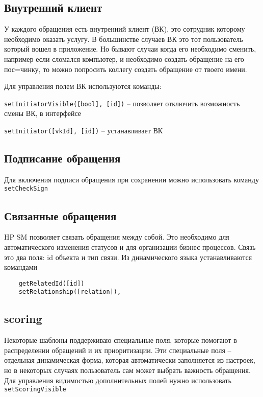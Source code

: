 \documentclass[../index.tex]{subfiles}
\begin{document}
\subsection{Внутренний клиент}

У каждого обращения есть внутренний клиент (ВК), это сотрудник которому необходимо оказать услугу. В большинстве случаев 
ВК это тот пользователь который вошел в приложение. Но бывают случаи когда его необходимо сменить, например если сломался компьютер,
и необходимо создать обращение на его пос=чинку, то можно попросить коллегу создать обращение от твоего имени.

Для управления полем ВК используются команды:

\verb|setInitiatorVisible([bool], [id])| -- позволяет отключить возможность смены ВК, в интерфейсе


\verb|setInitiator([vkId], [id])| -- устанавливает ВК

\subsection{Подписание обращения}
Для включения подписи обращения при сохранении можно использовать команду \verb|setCheckSign|


\subsection{Связанные обращения}
HP SM позволяет связать обращения между собой. Это необходимо для автоматического изменения статусов и для
организации бизнес процессов. Связь это два поля: id объекта и тип связи. Из динамического языка устанавливаются командами
\begin{verbatim}
    getRelatedId([id])
    setRelationship([relation]),
\end{verbatim} 

\subsection{scoring}
Некоторые шаблоны поддерживаю специальные поля, которые помогают в распределении обращений и их приоритизации.
Эти специальные поля -- отдельная динамическая форма, которая автоматически заполняется из настроек, но в некоторых
случаях пользователь сам может выбрать важность обращения. Для управления видимостью дополнительных полей нужно использовать
\verb|setScoringVisible|
\end{document}
